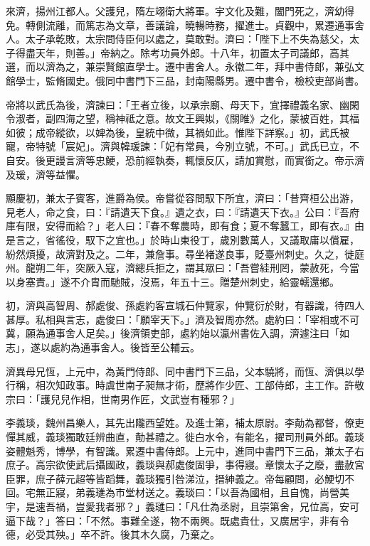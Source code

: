 \begin{pinyinscope}
 來濟，揚州江都人。父護兒，隋左翊衛大將軍。宇文化及難，闔門死之，濟幼得免。轉側流離，而篤志為文章，善議論，曉暢時務，擢進士。貞觀中，累遷通事舍人。太子承乾敗，太宗問侍臣何以處之，莫敢對。濟曰：「陛下上不失為慈父，太子得盡天年，則善。」帝納之。除考功員外郎。十八年，初置太子司議郎，高其選，而以濟為之，兼崇賢館直學士。遷中書舍人。永徽二年，拜中書侍郎，兼弘文館學士，監脩國史。俄同中書門下三品，封南陽縣男。遷中書令，檢校吏部尚書。



 帝將以武氏為後，濟諫曰：「王者立後，以承宗廟、母天下，宜擇禮義名家、幽閑令淑者，副四海之望，稱神祗之意。故文王興姒，《關睢》之化，蒙被百姓，其福如彼；成帝縱欲，以婢為後，皇統中微，其禍如此。惟陛下詳察。」初，武氏被寵，帝特號「宸妃」。濟與韓瑗諫：「妃有常員，今別立號，不可。」武氏已立，不自安。後更謾言濟等忠鯁，恐前經執奏，輒懷反仄，請加賞慰，而實銜之。帝示濟及瑗，濟等益懼。



 顯慶初，兼太子賓客，進爵為侯。帝嘗從容問馭下所宜，濟曰：「昔齊桓公出游，見老人，命之食，曰：『請遺天下食。』遺之衣，曰：『請遺天下衣。』公曰：『吾府庫有限，安得而給？」老人曰：『春不奪農時，即有食；夏不奪蠶工，即有衣。』由是言之，省徭役，馭下之宜也。」於時山東役丁，歲別數萬人，又議取庸以償雇，紛然煩擾，故濟對及之。二年，兼詹事。尋坐褚遂良事，貶臺州刺史。久之，徙庭州。龍朔二年，突厥入寇，濟總兵拒之，謂其眾曰：「吾嘗絓刑罔，蒙赦死，今當以身塞責。」遂不介胄而馳賊，沒焉，年五十三。贈楚州刺史，給靈轜還鄉。



 初，濟與高智周、郝處俊、孫處約客宣城石仲覽家，仲覽衍於財，有器識，待四人甚厚。私相與言志，處俊曰：「願宰天下。」濟及智周亦然。處約曰：「宰相或不可冀，願為通事舍人足矣。」後濟領吏部，處約始以瀛州書佐入調，濟遽注曰「如志」，遂以處約為通事舍人。後皆至公輔云。



 濟異母兄恆，上元中，為黃門侍郎、同中書門下三品，父本驍將，而恆、濟俱以學行稱，相次知政事。時虞世南子昶無才術，歷將作少匠、工部侍郎，主工作。許敬宗曰：「護兒兒作相，世南男作匠，文武豈有種邪？」



 李義琰，魏州昌樂人，其先出隴西望姓。及進士第，補太原尉。李勣為都督，僚吏憚其威，義琰獨敢廷辨曲直，勣甚禮之。徙白水令，有能名，擢司刑員外郎。義琰姿體魁秀，博學，有智識。累遷中書侍郎。上元中，進同中書門下三品，兼太子右庶子。高宗欲使武后攝國政，義琰與郝處俊固爭，事得寢。章懷太子之廢，盡赦宮臣罪，庶子薛元超等皆蹈舞，義琰獨引咎涕泣，搢紳義之。帝每顧問，必鯁切不回。宅無正寢，弟義璡為市堂材送之。義琰曰：「以吾為國相，且自愧，尚營美宇，是速吾禍，豈愛我者邪？」義璡曰：「凡仕為丞尉，且崇第舍，兄位高，安可逼下哉？」答曰：「不然。事難全遂，物不兩興。既處貴仕，又廣居宇，非有令德，必受其殃。」卒不許。後其木久腐，乃棄之。




\end{pinyinscope}
